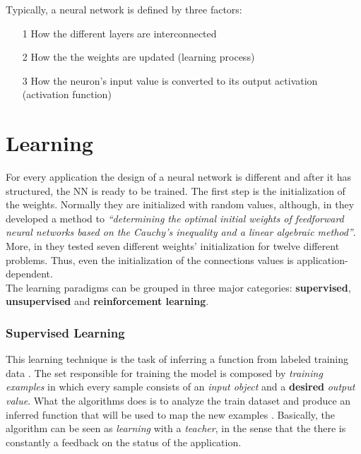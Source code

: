 \vspace*{0.33in}

\noindent Typically, a neural network is defined by three factors:
\begin{itemize}
    \item[1] How the different layers are interconnected
    \item[2] How the the weights are updated (learning process)
    \item[3] How the neuron's input value is converted to its output activation (activation function)
\end{itemize}

\section{Learning}
For every application the design of a neural network is different and after it has structured, the NN is ready to be trained. The first step is the initialization of the weights. Normally they are initialized with random values, although, in \cite{yam2000weight} they developed a method to \textit{``determining the optimal initial weights of feedforward neural networks based on the Cauchy's inequality and a linear algebraic method''}. More, in \cite{fernandez2001weight} they tested seven different weights' initialization for twelve different problems. Thus, even the initialization of the connections values is application-dependent. \\
\noindent The learning paradigms can be grouped in three major categories: \textbf{supervised}, \textbf{unsupervised} and \textbf{reinforcement learning}.

\subsubsection{Supervised Learning}
This learning technique is the task of inferring a function from labeled training data \cite{sup_learn_wiki} \cite{mohri2012foundations}. The set responsible for training the model is composed by \textit{training examples} in which every sample consists of an \textit{input object} and a \textbf{desired} \textit{output value}. What the algorithms does is to analyze the train dataset and produce an inferred function that will be used to map the new examples \cite{sup_learn_wiki}. Basically, the algorithm can be seen as \textit{learning} with a \textit{teacher}, in the sense that the there is constantly a feedback on the status of the application.

